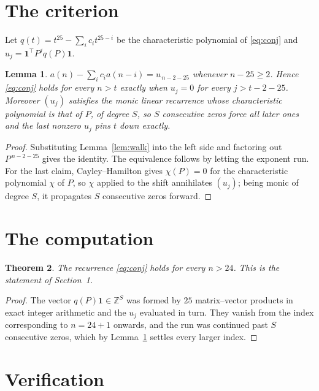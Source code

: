 \documentclass[11pt,a4paper]{article}
\theoremstyle{plain}
\newtheorem{theorem}{Theorem}
\newtheorem{lemma}[theorem]{Lemma}
\theoremstyle{definition}
\begin{document}
\section{The criterion}

Let $q(t)=t^{25}-\sum_i c_i t^{25-i}$ be the characteristic polynomial of
\eqref{eq:conj} and $u_j=\mathbf{1}^{\!\top}P^{j}q(P)\mathbf{1}$.

\begin{lemma}\label{lem:crit}
$a(n)-\sum_i c_i a(n-i)=u_{\,n-2-25}$ whenever $n-25\ge2$. Hence
\eqref{eq:conj} holds for every $n>t$ exactly when $u_j=0$ for every
$j>t-2-25$. Moreover $(u_j)$ satisfies the monic linear recurrence whose
characteristic polynomial is that of $P$, of degree $S$, so $S$ consecutive zeros force all
later ones and the last nonzero $u_j$ pins $t$ down exactly.
\end{lemma}

\begin{proof}
Substituting Lemma~\ref{lem:walk} into the left side and factoring out
$P^{\,n-2-25}$ gives the identity. The equivalence follows by letting the exponent
run. For the last claim, Cayley--Hamilton gives $\chi(P)=0$ for the characteristic
polynomial $\chi$ of $P$, so $\chi$ applied to the shift annihilates $(u_j)$; being monic of
degree $S$, it propagates $S$ consecutive zeros forward.
\end{proof}

\section{The computation}

\begin{theorem}
The recurrence \eqref{eq:conj} holds for every $n>24$. This is the statement of
Section~1.
\end{theorem}

\begin{proof}
The vector $q(P)\mathbf{1}\in\mathbb{Z}^{S}$ was formed by $25$ matrix--vector
products in exact integer arithmetic and the $u_j$ evaluated in turn. They vanish from the
index corresponding to $n=24+1$ onwards, and the run was continued past $S$ consecutive
zeros, which by Lemma~\ref{lem:crit} settles every larger index.
\end{proof}

\section{Verification}
\end{document}
